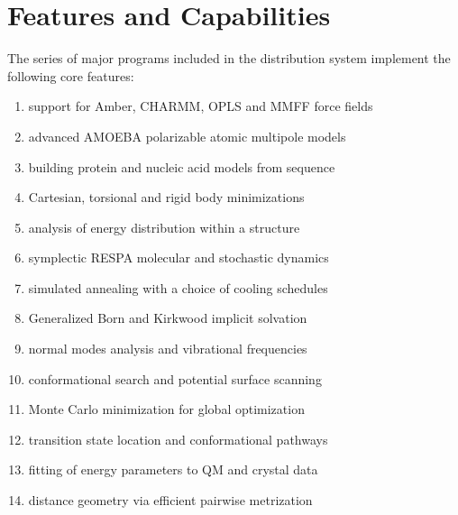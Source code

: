 \documentclass[letterpaper,11pt,english]{sphinxmanual}
\begin{document}
\section{Features and Capabilities}
\label{\detokenize{text/introduction:features-and-capabilities}}
\sphinxAtStartPar
The series of major programs included in the distribution system implement the following core features:
\begin{enumerate}
%
\item {} 
\sphinxAtStartPar
support for Amber, CHARMM, OPLS and MMFF force fields

\item {} 
\sphinxAtStartPar
advanced AMOEBA polarizable atomic multipole models

\item {} 
\sphinxAtStartPar
building protein and nucleic acid models from sequence

\item {} 
\sphinxAtStartPar
Cartesian, torsional and rigid body minimizations

\item {} 
\sphinxAtStartPar
analysis of energy distribution within a structure

\item {} 
\sphinxAtStartPar
symplectic RESPA molecular and stochastic dynamics

\item {} 
\sphinxAtStartPar
simulated annealing with a choice of cooling schedules

\item {} 
\sphinxAtStartPar
Generalized Born and Kirkwood implicit solvation

\item {} 
\sphinxAtStartPar
normal modes analysis and vibrational frequencies

\item {} 
\sphinxAtStartPar
conformational search and potential surface scanning

\item {} 
\sphinxAtStartPar
Monte Carlo minimization for global optimization

\item {} 
\sphinxAtStartPar
transition state location and conformational pathways

\item {} 
\sphinxAtStartPar
fitting of energy parameters to QM and crystal data

\item {} 
\sphinxAtStartPar
distance geometry via efficient pairwise metrization


\end{enumerate}
\end{document}
